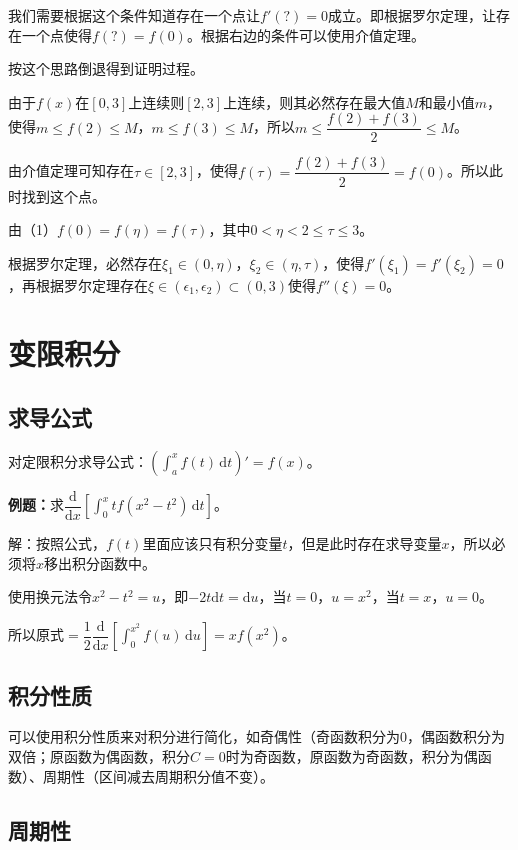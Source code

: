\documentclass[UTF8, 12pt]{ctexart}
\begin{document}
我们需要根据这个条件知道存在一个点让$f'(?)=0$成立。即根据罗尔定理，让存在一个点使得$f(?)=f(0)$。根据右边的条件可以使用介值定理。

按这个思路倒退得到证明过程。

由于$f(x)$在$[0,3]$上连续则$[2,3]$上连续，则其必然存在最大值$M$和最小值$m$，使得$m\leqslant f(2)\leqslant M$，$m\leqslant f(3)\leqslant M$，所以$m\leqslant\dfrac{f(2)+f(3)}{2}\leqslant M$。

由介值定理可知存在$\tau\in[2,3]$，使得$f(\tau)=\dfrac{f(2)+f(3)}{2}=f(0)$。所以此时找到这个点。

由（1）$f(0)=f(\eta)=f(\tau)$，其中$0<\eta<2\leqslant\tau\leqslant3$。

根据罗尔定理，必然存在$\xi_1\in(0,\eta)$，$\xi_2\in(\eta,\tau)$，使得$f'(\xi_1)=f'(\xi_2)=0$，再根据罗尔定理存在$\xi\in(\epsilon_1,\epsilon_2)\subset(0,3)$使得$f''(\xi)=0$。

\section{变限积分}

\subsection{求导公式}

对定限积分求导公式：$(\int_a^xf(t)\,\textrm{d}t)'=f(x)$。

\textbf{例题：}求$\dfrac{\textrm{d}}{\textrm{d}x}[\int_0^xtf(x^2-t^2)\,\textrm{d}t]$。

解：按照公式，$f(t)$里面应该只有积分变量$t$，但是此时存在求导变量$x$，所以必须将$x$移出积分函数中。

使用换元法令$x^2-t^2=u$，即$-2t\textrm{d}t=\textrm{d}u$，当$t=0$，$u=x^2$，当$t=x$，$u=0$。

所以原式$=\dfrac{1}{2}\dfrac{\textrm{d}}{\textrm{d}x}[\int_0^{x^2}f(u)\,\textrm{d}u]=xf(x^2)$。

\subsection{积分性质}

可以使用积分性质来对积分进行简化，如奇偶性（奇函数积分为0，偶函数积分为双倍；原函数为偶函数，积分$C=0$时为奇函数，原函数为奇函数，积分为偶函数）、周期性（区间减去周期积分值不变）。

\subsection{周期性}
\end{document}
